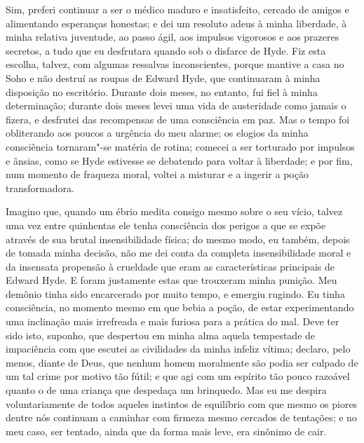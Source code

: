 Sim, preferi continuar a ser o médico maduro e insatisfeito, cercado de
amigos e alimentando esperanças honestas; e dei um resoluto adeus à
minha liberdade, à minha relativa juventude, ao passo ágil, aos
impulsos vigorosos e aos prazeres secretos, a tudo que eu desfrutara
quando sob o disfarce de Hyde.  Fiz esta escolha, talvez, com algumas
ressalvas inconscientes, porque mantive a casa no Soho e não destruí as
roupas de Edward Hyde, que continuaram à minha disposição no
escritório.  Durante dois meses, no entanto, fui fiel à minha
determinação; durante dois meses levei uma vida de austeridade como
jamais o fizera, e desfrutei das recompensas de uma consciência em paz.
 Mas o tempo foi obliterando aos poucos a urgência do meu alarme; os
elogios da minha consciência tornaram"-se matéria de rotina; comecei a
ser torturado por impulsos e ânsias, como se Hyde estivesse se
debatendo para voltar à liberdade; e por fim, num momento de fraqueza
moral, voltei a misturar e a ingerir a poção transformadora.

Imagino que, quando um ébrio medita consigo mesmo sobre o seu vício,
talvez uma vez entre quinhentas ele tenha consciência dos perigos a que
se expõe através de sua brutal insensibilidade física; do mesmo modo,
eu também, depois de tomada minha decisão, não me dei conta da completa
insensibilidade moral e da insensata propensão à crueldade que eram as
características principais de Edward Hyde.  E foram justamente estas
que trouxeram minha punição.  Meu demônio tinha sido encarcerado por
muito tempo, e emergiu rugindo.  Eu tinha consciência, no momento mesmo
em que bebia a poção, de estar experimentando uma inclinação mais
irrefreada e mais furiosa para a prática do mal.  Deve ter sido isto,
suponho, que despertou em minha alma aquela tempestade de impaciência
com que escutei as civilidades da minha infeliz vítima; declaro, pelo
menos, diante de Deus, que nenhum homem moralmente são podia ser
culpado de um tal crime por motivo tão fútil; e que agi com um espírito
tão pouco razoável quanto o de uma criança que despedaça um brinquedo. 
Mas eu me despira voluntariamente de todos aqueles instintos de
equilíbrio com que mesmo os piores dentre nós continuam a caminhar com
firmeza mesmo cercados de tentações; e no meu caso, ser tentado, ainda
que da forma mais leve, era sinônimo de cair.

